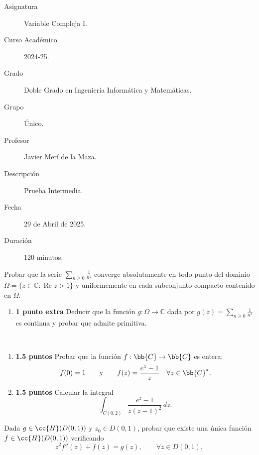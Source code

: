 \documentclass[12pt]{article}
\renewcommand{\Re}{\operatorname{Re}} %
\begin{document}

    
    

    \begin{description}
        \item[Asignatura] Variable Compleja I.
        \item[Curso Académico] 2024-25.
        \item[Grado] Doble Grado en Ingeniería Informática y Matemáticas.
        \item[Grupo] Único.
        \item[Profesor] Javier Merí de la Maza.
        \item[Descripción] Prueba Intermedia.
        \item[Fecha] 29 de Abril de 2025.
        \item[Duración] 120 minutos.
    \end{description}
    \newpage

    \begin{ejercicio}[3.5 puntos]
        Probar que la serie $\sum\limits_{n \geq 0} \frac{1}{n^z}$ converge absolutamente en todo punto del dominio $\Omega = \{z \in \mathbb{C} : \Re z > 1\}$ y uniformemente en cada subconjunto compacto contenido en $\Omega$.
        \begin{enumerate}
            \item \textbf{1 punto extra} Deducir que la función $g : \Omega \to \mathbb{C}$ dada por $g(z)=\sum\limits_{n \geq 0} \frac{1}{n^z}$ es continua y probar que admite primitiva.
        \end{enumerate}
    \end{ejercicio}

    \begin{ejercicio}~
        \begin{enumerate}
            \item \textbf{1.5 puntos} Probar que la función $f:\bb{C}\to \bb{C}$ es entera:
            \begin{equation*}
                f(0)=1\qquad \text{y}\qquad f(z)=\dfrac{e^z-1}{z}\quad \forall z\in\bb{C}^*.
            \end{equation*}

            \item \textbf{1.5 puntos} Calcular la integral
            \begin{equation*}
                \int_{C(0,2)} \frac{e^z-1}{z(z - 1)^2} \, dz.
            \end{equation*}
        \end{enumerate}
    \end{ejercicio}

    \begin{ejercicio}[3.5 puntos]
        Dada $g\in \cc{H}(D(0,1))$ y $z_0\in D(0,1)$, probar que existe una única función $f\in \cc{H}(D(0,1))$ verificando
        \begin{equation*}
            z^2f''(z)+ f(z) = g(z),\qquad \forall z\in D(0,1),
        \end{equation*}
    \end{ejercicio}
\end{document}

